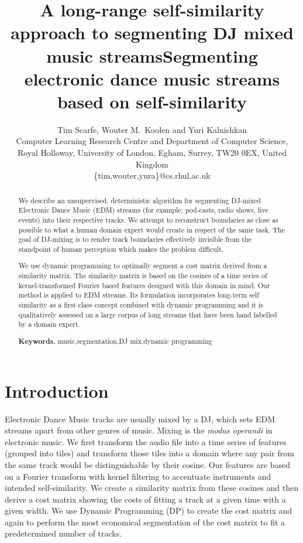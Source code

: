 \documentclass[twocolumn]{article}
\title{
A long-range self-similarity approach to segmenting DJ mixed music streams}
\author{Tim Scarfe, Wouter M.~Koolen and Yuri Kalnishkan \\ 
Computer Learning Research
 Centre and Department of Computer Science, \\ 
Royal Holloway,  University of London, Egham, Surrey, TW20 0EX, United Kingdom\\
\{tim,wouter,yura\}@cs.rhul.ac.uk
}
\title{Segmenting electronic dance music streams based on self-similarity}
\begin{document}
\maketitle

\begin{abstract}

We describe an unsupervised, deterministic algorithm for segmenting DJ-mixed Electronic Dance Music (EDM) streams (for example; pod-casts, radio shows, live events) into their respective tracks. We attempt to reconstruct boundaries as close as possible to what a human domain expert would create in respect of the same task. The goal of DJ-mixing is to render track boundaries effectively invisible from the standpoint of human perception which makes the problem difficult.

We use dynamic programming to optimally segment a cost matrix derived from a similarity matrix. The similarity matrix is based on the cosines of a time series of kernel-transformed Fourier based features designed with this domain in mind. Our method is applied to EDM streams. Its formulation incorporates long-term self similarity as a first class concept combined with dynamic programming and it is qualitatively assessed on a large corpus of long streams that have been hand labelled by a domain expert.
\smallskip

\noindent \textbf{Keywords.} \noindent music,segmentation,DJ mix,dynamic programming

\end{abstract}


\vspace{1em}

\section{Introduction}

Electronic Dance Music tracks are usually mixed by a DJ, which sets EDM streams apart from other genres of music. Mixing is the \textit{modus operandi} in electronic music. We first transform the audio file into a time series of features (grouped into tiles) and transform those tiles into a domain where any pair from the same track would be distinguishable by their cosine. Our features are based on a Fourier transform with kernel filtering to accentuate instruments and intended self-similarity. We create a similarity matrix from these cosines and then derive a cost matrix showing the costs of fitting a track at a given time with a given width. We use Dynamic Programming (DP) to create the cost matrix and again to perform the most economical segmentation of the cost matrix to fit a predetermined number of tracks.
\end{document}
